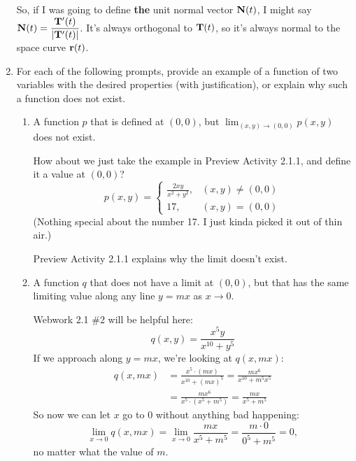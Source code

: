 \begin{enumerate}[leftmargin=0pt]
\begin{red}
        So, if I was going to define \textbf{the} unit normal vector $\mathbf{N}(t)$, I might say $\mathbf{N}(t) = \dfrac{\mathbf{T}'(t)}{|\mathbf{T}'(t)|}$. It's always orthogonal to $\mathbf{T}(t)$, so it's always normal to the space curve $\mathbf{r}(t)$.
    \end{red}
    
    \item For each of the following prompts, provide an example of a function of two variables with the desired properties (with justification), or explain why such a function does not exist.
    \begin{enumerate}
        \item A function $p$ that is defined at $(0, 0)$, but $\lim_{(x, y) \to (0, 0)} p(x, y)$ does not exist.
        
        \begin{red}
            How about we just take the example in Preview Activity 2.1.1, and define it a value at $(0, 0)$?
            \[ p(x,y) = 
            \begin{cases}
                \frac{2xy}{x^2+y^2}, & (x, y) \neq (0, 0) \\
                17, & (x, y) = (0, 0)
            \end{cases}
            \]
            (Nothing special about the number 17. I just kinda picked it out of thin air.)
            
            Preview Activity 2.1.1 explains why the limit doesn't exist.
        \end{red}
        \item A function $q$ that does not have a limit at $(0, 0)$, but that has the same limiting value along any line $y=mx$ as $x \to 0$. 
        
        \begin{red}
            Webwork 2.1 \#2 will be helpful here:
            \[q(x,y) = \frac{x^{5}y}{x^{10}+y^{5}}\]
            If we approach along $y = mx$, we're looking at $q(x, mx):$
            \begin{align*}
                q(x, mx) &= \frac{x^{5}\cdot (mx)}{x^{10}+(mx)^{5}}
                = \frac{mx^6}{x^{10} + m^5 x^5} \\
                &= \frac{mx^6}{x^5\cdot(x^5+m^5)} 
                = \frac{mx}{x^5+m^5}
            \end{align*}
            So now we can let $x$ go to 0 without anything bad happening:
            \[\lim_{x\to 0} q(x, mx) = \lim_{x \to 0} \frac{mx}{x^5+m^5} = \frac{m\cdot 0}{0^5 + m^5} = 0,\]
            no matter what the value of $m$.
            

\end{red}
\end{enumerate}
\end{enumerate}

